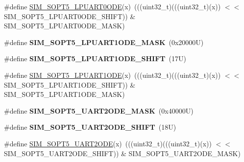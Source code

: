 \begin{DoxyCompactItemize}
\item 
\#define \mbox{\hyperlink{group___s_i_m___register___masks_gabfef4d470a15a1a20978af220d3c5b58}{S\+I\+M\+\_\+\+S\+O\+P\+T5\+\_\+\+L\+P\+U\+A\+R\+T0\+O\+DE}}(x)~(((uint32\+\_\+t)(((uint32\+\_\+t)(x)) $<$$<$ S\+I\+M\+\_\+\+S\+O\+P\+T5\+\_\+\+L\+P\+U\+A\+R\+T0\+O\+D\+E\+\_\+\+S\+H\+I\+FT)) \& S\+I\+M\+\_\+\+S\+O\+P\+T5\+\_\+\+L\+P\+U\+A\+R\+T0\+O\+D\+E\+\_\+\+M\+A\+SK)
\item 
\mbox{\label{group___s_i_m___register___masks_gadc5f47551b4960defc8f07b388674b72}} 
\#define {\bfseries S\+I\+M\+\_\+\+S\+O\+P\+T5\+\_\+\+L\+P\+U\+A\+R\+T1\+O\+D\+E\+\_\+\+M\+A\+SK}~(0x20000\+U)
\item 
\mbox{\label{group___s_i_m___register___masks_ga23dc87a4ba4b3215f93dc6ec908db425}} 
\#define {\bfseries S\+I\+M\+\_\+\+S\+O\+P\+T5\+\_\+\+L\+P\+U\+A\+R\+T1\+O\+D\+E\+\_\+\+S\+H\+I\+FT}~(17\+U)
\item 
\#define \mbox{\hyperlink{group___s_i_m___register___masks_gad11f49766bf7e9ab4d42ef9edfa59d5a}{S\+I\+M\+\_\+\+S\+O\+P\+T5\+\_\+\+L\+P\+U\+A\+R\+T1\+O\+DE}}(x)~(((uint32\+\_\+t)(((uint32\+\_\+t)(x)) $<$$<$ S\+I\+M\+\_\+\+S\+O\+P\+T5\+\_\+\+L\+P\+U\+A\+R\+T1\+O\+D\+E\+\_\+\+S\+H\+I\+FT)) \& S\+I\+M\+\_\+\+S\+O\+P\+T5\+\_\+\+L\+P\+U\+A\+R\+T1\+O\+D\+E\+\_\+\+M\+A\+SK)
\item 
\mbox{\label{group___s_i_m___register___masks_ga2b5bbe588bc3ea2299deead3e18b3932}} 
\#define {\bfseries S\+I\+M\+\_\+\+S\+O\+P\+T5\+\_\+\+U\+A\+R\+T2\+O\+D\+E\+\_\+\+M\+A\+SK}~(0x40000\+U)
\item 
\mbox{\label{group___s_i_m___register___masks_gad3283784bd7916c036b2299401fa7468}} 
\#define {\bfseries S\+I\+M\+\_\+\+S\+O\+P\+T5\+\_\+\+U\+A\+R\+T2\+O\+D\+E\+\_\+\+S\+H\+I\+FT}~(18\+U)
\item 
\#define \mbox{\hyperlink{group___s_i_m___register___masks_gafec28602bcec17cdcacfdbf9a3b1c4b6}{S\+I\+M\+\_\+\+S\+O\+P\+T5\+\_\+\+U\+A\+R\+T2\+O\+DE}}(x)~(((uint32\+\_\+t)(((uint32\+\_\+t)(x)) $<$$<$ S\+I\+M\+\_\+\+S\+O\+P\+T5\+\_\+\+U\+A\+R\+T2\+O\+D\+E\+\_\+\+S\+H\+I\+FT)) \& S\+I\+M\+\_\+\+S\+O\+P\+T5\+\_\+\+U\+A\+R\+T2\+O\+D\+E\+\_\+\+M\+A\+SK)
\end{DoxyCompactItemize}
